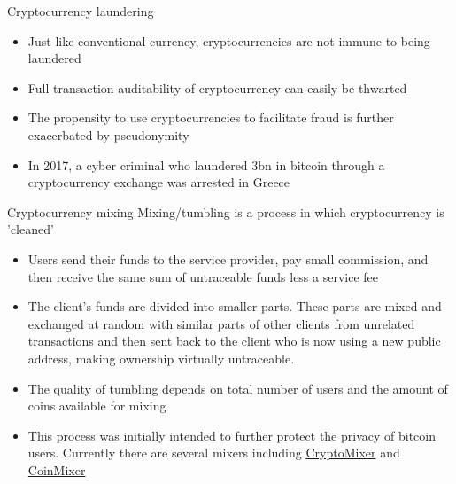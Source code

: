\documentclass[10pt]{beamer}
\begin{document}

\begin{frame}{Cryptocurrency laundering}
	\begin{itemize}
		\item Just like conventional currency, cryptocurrencies are not immune to being laundered
		\item Full transaction auditability of cryptocurrency can easily be thwarted
		\item The propensity to use cryptocurrencies to facilitate fraud is further exacerbated by pseudonymity
		\item In 2017, a cyber criminal who laundered \textsterling3bn in bitcoin through a cryptocurrency exchange was arrested in Greece
	\end{itemize}
\end{frame}


\begin{frame}{Cryptocurrency mixing}
	Mixing/tumbling is a process in which cryptocurrency is 'cleaned'
	\begin{itemize}
		\item Users send their funds to the service provider, pay small commission, and then receive the same sum of untraceable funds less a service fee
		\item The client's funds are divided into smaller parts. These parts are mixed and exchanged at random with similar parts of other clients from unrelated transactions and then sent back to the client who is now using a new public address, making ownership virtually untraceable.
		\item The quality of tumbling depends on total number of users and the amount of coins available for mixing
		\item This process was initially intended to further protect the privacy of bitcoin users. Currently there are several mixers including \href{https://cryptomixer.io}{CryptoMixer} and \href{https://coinmixer.se/en/}{CoinMixer}
	\end{itemize}
\end{frame}

\end{document}
